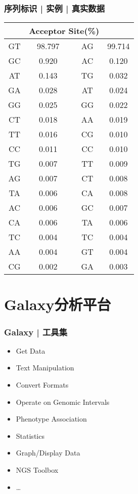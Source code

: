 \begin{frame}
	\frametitle{序列标识 | 实例 | 真实数据}
	\begin{table}
		\centering
		\begin{tabular}{cc|cc}
			\hline
			\rowcolor{blue!50} \multicolumn{2}{c|}{Donor Sites(\%)} & \multicolumn{2}{c}{Acceptor Site(\%)}\\
			\hline
			GT & 98.797 & AG & 99.714\\
			GC & 0.920 & AC & 0.120\\
			AT & 0.143 & TG & 0.032\\
			GA & 0.028 & AT & 0.024\\
			GG & 0.025 & GG & 0.022\\
			CT & 0.018 & AA & 0.019\\
			TT & 0.016 & CG & 0.010\\
			CC & 0.011 & CC & 0.010\\
			TG & 0.007 & TT & 0.009\\
			AG & 0.007 & CT & 0.008\\
			TA & 0.006 & CA & 0.008\\
			AC & 0.006 & GC & 0.007\\
			CA & 0.006 & TA & 0.006\\
			TC & 0.004 & TC & 0.004\\
			AA & 0.004 & GT & 0.004\\
			CG & 0.002 & GA & 0.003\\
			\hline
		\end{tabular}
	\end{table}
\end{frame}

\section{Galaxy分析平台}
\begin{frame}
	\frametitle{Galaxy | 工具集}
	\begin{itemize}
		\item Get Data
		\item Text Manipulation
		\item Convert Formats
		\item Operate on Genomic Intervals
		\item Phenotype Association
		\item Statistics
		\item Graph/Display Data
		\item NGS Toolbox
		\item \ldots
	\end{itemize}
\end{frame}

